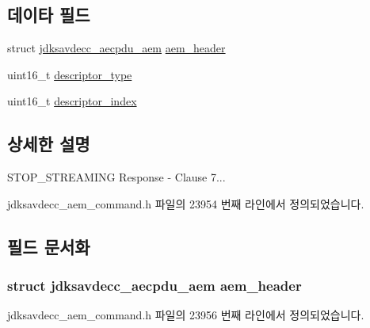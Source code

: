 \subsection*{데이타 필드}
\begin{DoxyCompactItemize}
\item 
struct \hyperlink{structjdksavdecc__aecpdu__aem}{jdksavdecc\+\_\+aecpdu\+\_\+aem} \hyperlink{structjdksavdecc__aem__command__stop__streaming__response_ae1e77ccb75ff5021ad923221eab38294}{aem\+\_\+header}
\item 
uint16\+\_\+t \hyperlink{structjdksavdecc__aem__command__stop__streaming__response_ab7c32b6c7131c13d4ea3b7ee2f09b78d}{descriptor\+\_\+type}
\item 
uint16\+\_\+t \hyperlink{structjdksavdecc__aem__command__stop__streaming__response_a042bbc76d835b82d27c1932431ee38d4}{descriptor\+\_\+index}
\end{DoxyCompactItemize}


\subsection{상세한 설명}
S\+T\+O\+P\+\_\+\+S\+T\+R\+E\+A\+M\+I\+NG Response -\/ Clause 7... 

jdksavdecc\+\_\+aem\+\_\+command.\+h 파일의 23954 번째 라인에서 정의되었습니다.



\subsection{필드 문서화}
\subsubsection[{\texorpdfstring{aem\+\_\+header}{aem_header}}]{\setlength{\rightskip}{0pt plus 5cm}struct {\bf jdksavdecc\+\_\+aecpdu\+\_\+aem} aem\+\_\+header}\hypertarget{structjdksavdecc__aem__command__stop__streaming__response_ae1e77ccb75ff5021ad923221eab38294}{}\label{structjdksavdecc__aem__command__stop__streaming__response_ae1e77ccb75ff5021ad923221eab38294}


jdksavdecc\+\_\+aem\+\_\+command.\+h 파일의 23956 번째 라인에서 정의되었습니다.

